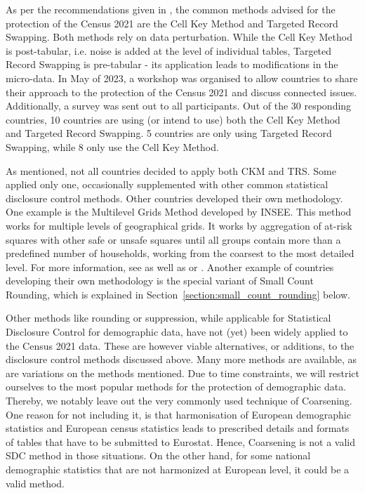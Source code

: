 As per the recommendations given in \cite{CROS-recommendations}, the common methods advised for the protection of the Census 2021 are the Cell Key Method and Targeted Record Swapping. Both methods rely on data perturbation. While the Cell Key Method is post-tabular, i.e. noise is added at the level of individual tables, Targeted Record Swapping is pre-tabular - its application leads to modifications in the micro-data.
In May of 2023, a workshop was organised to allow countries to share their approach to the protection of the Census 2021 and discuss connected issues. Additionally, a survey was sent out to all participants. Out of the 30 responding countries, 10 countries are using (or intend to use) both the Cell Key Method and Targeted Record Swapping. 5 countries are only using Targeted Record Swapping, while 8 only use the Cell Key Method\cite{censusmethodsUNECE}. 

As mentioned, not all countries decided to apply both CKM and TRS. Some applied only one, occasionally supplemented with other common statistical disclosure control methods. Other countries developed their own methodology. One example is the Multilevel Grids Method developed by INSEE\cite{censusmethodsUNECE,INSEE-mlg}. This method works for multiple levels of geographical grids. It works by aggregation of at-risk squares with other safe or unsafe squares until all groups contain more than a predefined number of households, working from the coarsest to the most detailed level. For more information, see \cite[~ch.5.1]{Guidelines1_GeoGL} as well as \cite{gridy} or \cite{INSEE-mlg}. Another example of countries developing their own methodology is the special variant of Small Count Rounding, which is explained in Section~\ref{section:small_count_rounding} below.

Other methods like rounding or suppression, while applicable for Statistical Disclosure Control for demographic data, have not (yet) been widely applied to the Census 2021 data. These are however viable alternatives, or additions, to the disclosure control methods discussed above. Many more methods are available, as are variations on the methods mentioned. Due to time constraints, we will restrict ourselves to the most popular  methods for the protection of demographic data.
Thereby, we notably leave out the very commonly used technique of Coarsening. One reason for not including it, is that harmonisation of European demographic statistics and European census statistics leads to prescribed details and formats of tables that have to be submitted to Eurostat. Hence, Coarsening is not a valid SDC method in those situations. On the other hand, for some national demographic statistics that are not harmonized at European level, it could be a valid method.

